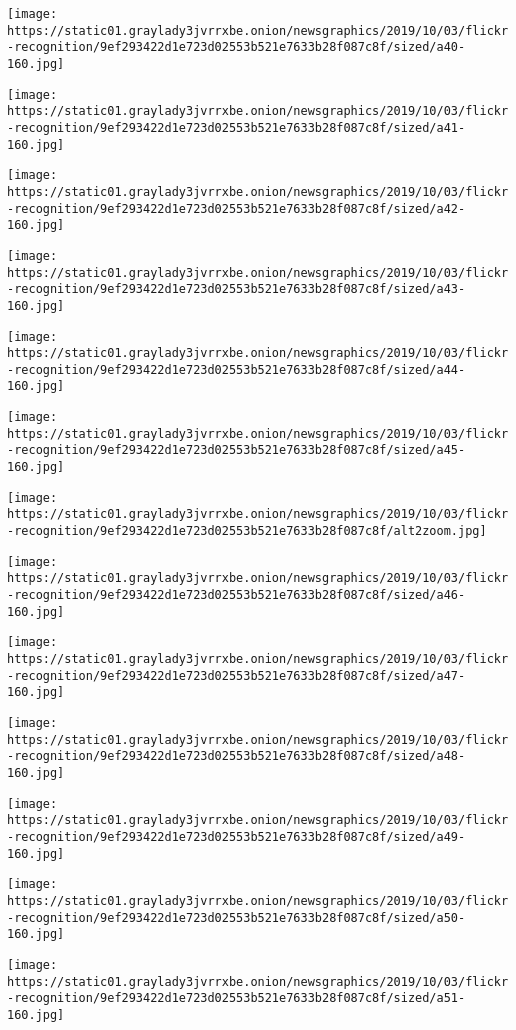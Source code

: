 \texttt{[image: https://static01.graylady3jvrrxbe.onion/newsgraphics/2019/10/03/flickr-recognition/9ef293422d1e723d02553b521e7633b28f087c8f/sized/a40-160.jpg]}

\texttt{[image: https://static01.graylady3jvrrxbe.onion/newsgraphics/2019/10/03/flickr-recognition/9ef293422d1e723d02553b521e7633b28f087c8f/sized/a41-160.jpg]}

\texttt{[image: https://static01.graylady3jvrrxbe.onion/newsgraphics/2019/10/03/flickr-recognition/9ef293422d1e723d02553b521e7633b28f087c8f/sized/a42-160.jpg]}

\texttt{[image: https://static01.graylady3jvrrxbe.onion/newsgraphics/2019/10/03/flickr-recognition/9ef293422d1e723d02553b521e7633b28f087c8f/sized/a43-160.jpg]}

\texttt{[image: https://static01.graylady3jvrrxbe.onion/newsgraphics/2019/10/03/flickr-recognition/9ef293422d1e723d02553b521e7633b28f087c8f/sized/a44-160.jpg]}

\texttt{[image: https://static01.graylady3jvrrxbe.onion/newsgraphics/2019/10/03/flickr-recognition/9ef293422d1e723d02553b521e7633b28f087c8f/sized/a45-160.jpg]}

\texttt{[image: https://static01.graylady3jvrrxbe.onion/newsgraphics/2019/10/03/flickr-recognition/9ef293422d1e723d02553b521e7633b28f087c8f/alt2zoom.jpg]}

\texttt{[image: https://static01.graylady3jvrrxbe.onion/newsgraphics/2019/10/03/flickr-recognition/9ef293422d1e723d02553b521e7633b28f087c8f/sized/a46-160.jpg]}

\texttt{[image: https://static01.graylady3jvrrxbe.onion/newsgraphics/2019/10/03/flickr-recognition/9ef293422d1e723d02553b521e7633b28f087c8f/sized/a47-160.jpg]}

\texttt{[image: https://static01.graylady3jvrrxbe.onion/newsgraphics/2019/10/03/flickr-recognition/9ef293422d1e723d02553b521e7633b28f087c8f/sized/a48-160.jpg]}

\texttt{[image: https://static01.graylady3jvrrxbe.onion/newsgraphics/2019/10/03/flickr-recognition/9ef293422d1e723d02553b521e7633b28f087c8f/sized/a49-160.jpg]}

\texttt{[image: https://static01.graylady3jvrrxbe.onion/newsgraphics/2019/10/03/flickr-recognition/9ef293422d1e723d02553b521e7633b28f087c8f/sized/a50-160.jpg]}

\texttt{[image: https://static01.graylady3jvrrxbe.onion/newsgraphics/2019/10/03/flickr-recognition/9ef293422d1e723d02553b521e7633b28f087c8f/sized/a51-160.jpg]}

